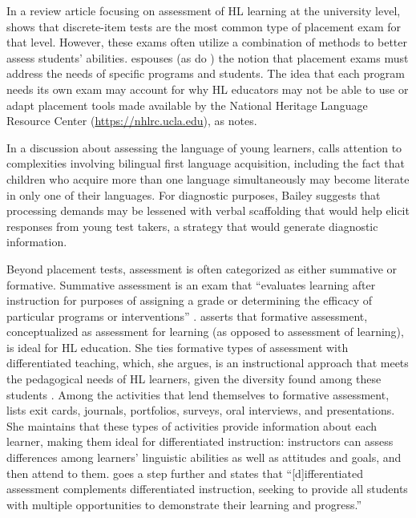 \documentclass[output=paper]{langscibook}
\begin{document}
In a review article focusing on assessment of HL learning at the university level, \citet{Son2017} shows that discrete-item tests are the most common type of placement exam for that level. However, these exams often utilize a combination of methods to better assess students’ abilities. \citet{Son2017} espouses (as do \citealt{BeaudrieDucar2012}) the notion that placement exams must address the needs of specific programs and students. The idea that each program needs its own exam may account for why HL educators may not be able to use or adapt placement tools made available by the National Heritage Language Resource Center (\url{https://nhlrc.ucla.edu}), as \citet{Carreira2014} notes.

In a discussion about assessing the language of young learners, \citet{Bailey2017} calls attention to complexities involving bilingual first language acquisition, including the fact that children who acquire more than one language simultaneously may become literate in only one of their languages. For diagnostic purposes, Bailey suggests that processing demands may be lessened with verbal scaffolding that would help elicit responses from young test takers, a strategy that would generate diagnostic information.

  Beyond placement tests, assessment is often categorized as either summative or formative. Summative assessment is an exam that “evaluates learning after instruction for purposes of assigning a grade or determining the efficacy of particular programs or interventions” \citep[100]{Carreira2012a}. \citet{Carreira2012a,Carreira2012b} asserts that formative assessment, conceptualized as assessment for learning (as opposed to assessment of learning), is ideal for HL education. She ties formative types of assessment with differentiated teaching, which, she argues, is an instructional approach that meets the pedagogical needs of HL learners, given the diversity found among these students \citep{Carreira2012b}. Among the activities that lend themselves to formative assessment, \citet{Carreira2012a} lists exit cards, journals, portfolios, surveys, oral interviews, and presentations. She maintains that these types of activities provide information about each learner, making them ideal for differentiated instruction: instructors can assess differences among learners’ linguistic abilities as well as attitudes and goals, and then attend to them. \citet[152]{Beaudrie2016} goes a step further and states that “[d]ifferentiated assessment complements differentiated instruction, seeking to provide all students with multiple opportunities to demonstrate their learning and progress.”
\end{document}
